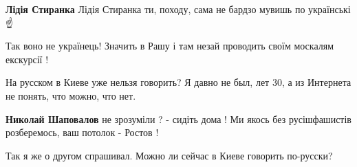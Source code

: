 \begin{itemize}
\begin{itemize}
 
\textbf{Лідія Стиранка} Лідія Стиранка ти, походу, сама не бардзо мувишь по українські☝️🤣
\end{itemize}

 

Так воно не українець! Значить в Рашу і там незай проводить своїм москалям екскурсії !


 

На русском в Киеве уже нельзя говорить? Я давно не был, лет 30, а из Интернета
не понять, что можно, что нет.


\begin{itemize}
 
\textbf{Николай Шаповалов} не зрозуміли ? - сидіть дома !
Ми якось без русішфашистів розберемось, ваш потолок - Ростов !

 
Так я же о другом спрашивал. Можно ли сейчас в Киеве говорить по-русски?

 

\end{itemize}
\end{itemize}
